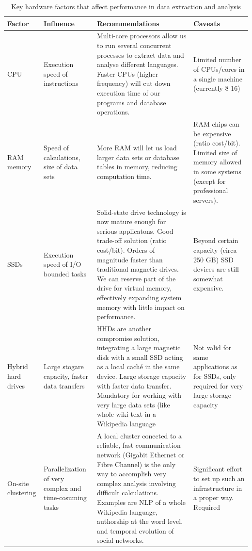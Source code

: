 \begin{longtable}[l]{|m{2.5cm}|m{3cm}|m{5cm}|m{4cm}|}
 \caption[Key hardware factors]
  {Key hardware factors that affect performance in data extraction and analysis}
  \label{tab:hw-factors}\\
  \hline
  {\bfseries Factor} & {\bfseries Influence} & {\bfseries Recommendations} &
  {\bfseries Caveats}\\
  \hline
   CPU & Execution speed of instructions & Multi-core processors allow us to run
  several concurrent processes to extract data and analyse different languages.
  Faster CPUs (higher frequency) will cut down execution time of our programs and
  database operations. & Limited number of CPUs/cores in a single machine (currently
  8-16)\\
  \hline
   RAM memory & Speed of calculations, size of data sets & More RAM will let us
  load larger data sets or database tables in memory, reducing computation time. &
  RAM chips can be expensive (ratio cost/bit). Limited size of memory allowed
  in some systems (except for professional servers).\\
  \hline
  SSDs & Execution speed of I/O bounded tasks &
  Solid-state drive technology is now mature enough for serious applicatons.
  Good trade-off solution (ratio cost/bit). Orders of magnitude faster than traditional
  magnetic drives. We can reserve part of the drive for
  virtual memory, effectively expanding system memory with little impact on performance. &
  Beyond certain capacity (circa 250 GB) SSD devices are still somewhat expensive.\\
  \hline
  Hybrid hard drives & Large stogare capacity, faster data transfers & 
  HHDs are another compromise solution, integrating a large magnetic disk with a
  small SSD acting as a local caché in the same device. Large storage capacity with
  faster data transfer. Mandatory for working with very large data sets (like whole
  wiki text in a Wikipedia language & 
  Not valid for same applications as for SSDs, only required for very large storage
  capacity\\
  \hline
  On-site clustering & Parallelization of very complex and time-cosuming tasks &
  A local cluster conected to a reliable, fast communication network (Gigabit
  Ethernet or Fibre Channel) is the only way to accomplish very complex analysis
  involving difficult calculations. Examples are NLP of a whole Wikipedia language,
  authorship at the word level, and temporal evolution of social networks. &
  Significant effort to set up such an infrastructure in a proper way. Required

\end{longtable}
